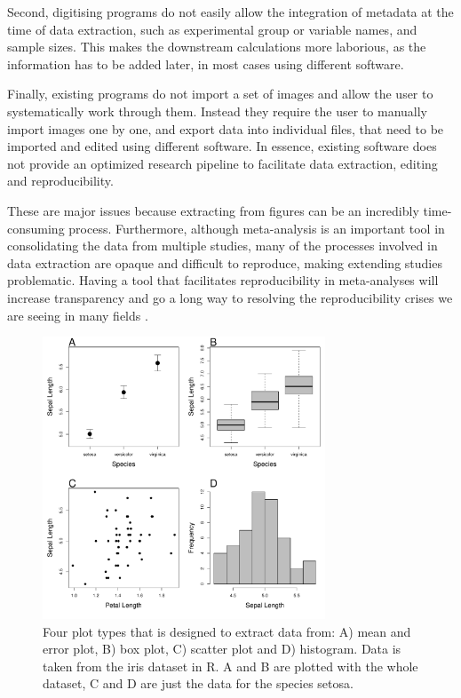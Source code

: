 \documentclass[article]{jss}
\begin{document}
Second, digitising programs do not easily allow the integration of metadata at the time of data extraction, such as experimental group or variable names, and sample sizes. This makes the downstream calculations more laborious, as the information has to be added later, in most cases using different software.

Finally, existing programs do not import a set of images and allow the user to systematically work through them. Instead they require the user to manually import images one by one, and export data into individual files, that need to be imported and edited using different software. In essence, existing software does not provide an optimized research pipeline to facilitate data extraction, editing and reproducibility. 

These are major issues because extracting from figures can be an incredibly time-consuming process. Furthermore, although meta-analysis is an important tool in consolidating the data from multiple studies, many of the processes involved in data extraction are opaque and difficult to reproduce, making extending studies problematic. Having a tool that facilitates reproducibility in meta-analyses will increase transparency and go a long way to resolving the reproducibility crises we are seeing in many fields \citep{peng_reproducible_2006, peng_reproducible_2011, sandve_ten_2013, Parker2016,Ihle2017}.


\begin{figure}[bt!] 
\centering
 \includegraphics[width=0.75\textwidth]{fig_plot_type.pdf} 
 \caption{Four plot types that  is designed to extract data from: A) mean and error plot, B) box plot, C) scatter plot and D) histogram. Data is taken from the iris dataset in R. A and B are plotted with the whole dataset, C and D are just the data for the species setosa.}
\label{fig:plot_type}
\end{figure}
\end{document}
